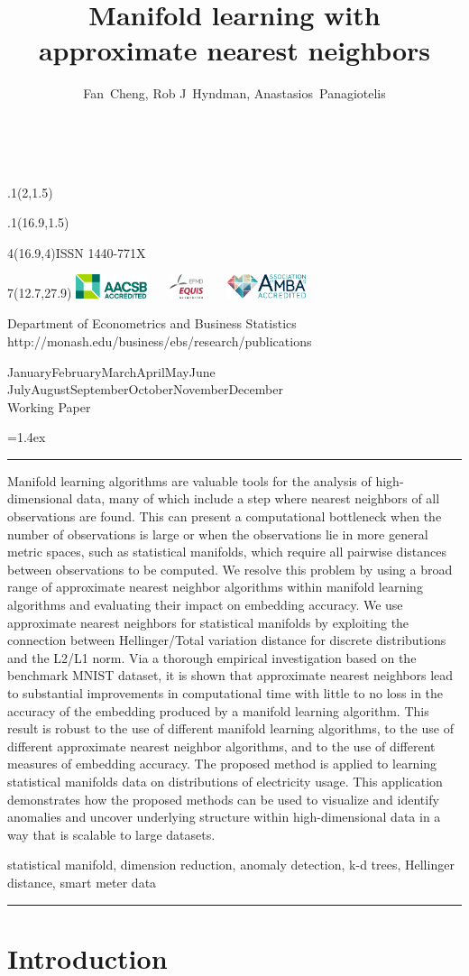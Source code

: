 \documentclass[11pt,a4paper,]{article}
\title{Manifold learning with approximate nearest neighbors}
\author{Fan~Cheng, Rob J~Hyndman, Anastasios~Panagiotelis}
\date{\sf\Date~\Month~\Year}
\makeatletter
\def\Date{\number\day}
\def\Month{\ifcase\month\or
 January\or February\or March\or April\or May\or June\or
 July\or August\or September\or October\or November\or December\fi}
\def\Year{\number\year}
\def\showjel{{\large\textsf{\textbf{JEL classification:}}~\@jel}}
\def\cover{{\sffamily\setcounter{page}{0}
        \thispagestyle{empty}
        \placefig{2}{1.5}{width=5cm}{monash2}
        \placefig{16.9}{1.5}{width=2.1cm}{MBusSchool}
        \begin{textblock}{4}(16.9,4)ISSN 1440-771X\end{textblock}
        \begin{textblock}{7}(12.7,27.9)\hfill
        \includegraphics[height=0.7cm]{AACSB}~~~
        \includegraphics[height=0.7cm]{EQUIS}~~~
        \includegraphics[height=0.7cm]{AMBA}
        \end{textblock}
        \vspace*{2cm}
        \begin{center}\Large
        Department of Econometrics and Business Statistics\\[.5cm]
        \footnotesize http://monash.edu/business/ebs/research/publications
        \end{center}\vspace{2cm}
        \begin{center}
        \fbox{\parbox{14cm}{\begin{onehalfspace}\centering\Huge\vspace*{0.3cm}
                \textsf{\textbf{\expandafter{\@title}}}\vspace{1cm}\par
                \LARGE\@author\end{onehalfspace}
        }}
        \end{center}
        \vfill
                \begin{center}\Large
                \Month~\Year\\[1cm]
                Working Paper \@wp
        \end{center}\vspace*{2cm}}}
\def\pageone{{\sffamily\setstretch{1}%
        \thispagestyle{empty}%
        \vbox to \textheight{%
        \raggedright\baselineskip=1.2cm
     {\fontsize{24.88}{30}\sffamily\textbf{\expandafter{\@title}}}
        \vspace{2cm}\par
        \hspace{1cm}\parbox{14cm}{\sffamily\large\@addresses}\vspace{1cm}\vfill
        \hspace{1cm}{\large\Date~\Month~\Year}\\[1cm]
        \hspace{1cm}\showjel\vss}}}
\def\blindtitle{{\sffamily
     \thispagestyle{plain}\raggedright\baselineskip=1.2cm
     {\fontsize{24.88}{30}\sffamily\textbf{\expandafter{\@title}}}\vspace{1cm}\par
        }}
\def\titlepage{{\cover\newpage\pageone\newpage\blindtitle}}
\let\maketitle\titlepage
\newenvironment{keywords}{\par\vspace{0.5cm}\noindent{\sffamily\textbf{Keywords:}}}{\vspace{0.25cm}\par\hrule\vspace{0.5cm}\par}
\renewenvironment{abstract}{\begin{minipage}{\textwidth}\parskip=1.4ex\noindent
\hrule\vspace{0.1cm}\par{\sffamily\textbf{\abstractname}}\newline}
  {\end{minipage}}
\def\placefig#1#2#3#4{\begin{textblock}{.1}(#1,#2)\rlap{\texttt{[image: \#4]}}\end{textblock}}
\makeatother
\begin{document}
\maketitle
\begin{abstract}
Manifold learning algorithms are valuable tools for the analysis of high-dimensional data, many of which include a step where nearest neighbors of all observations are found. This can present a computational bottleneck when the number of observations is large or when the observations lie in more general metric spaces, such as statistical manifolds, which require all pairwise distances between observations to be computed. We resolve this problem by using a broad range of approximate nearest neighbor algorithms within manifold learning algorithms and evaluating their impact on embedding accuracy. We use approximate nearest neighbors for statistical manifolds by exploiting the connection between Hellinger/Total variation distance for discrete distributions and the L2/L1 norm. Via a thorough empirical investigation based on the benchmark MNIST dataset, it is shown that approximate nearest neighbors lead to substantial improvements in computational time with little to no loss in the accuracy of the embedding produced by a manifold learning algorithm. This result is robust to the use of different manifold learning algorithms, to the use of different approximate nearest neighbor algorithms, and to the use of different measures of embedding accuracy. The proposed method is applied to learning statistical manifolds data on distributions of electricity usage. This application demonstrates how the proposed methods can be used to visualize and identify anomalies and uncover underlying structure within high-dimensional data in a way that is scalable to large datasets.
\end{abstract}
\begin{keywords}
statistical manifold, dimension reduction, anomaly detection, k-d trees, Hellinger distance, smart meter data
\end{keywords}

\newpage

\hypertarget{introduction}{%
\section{Introduction}\label{introduction}}
\end{document}
